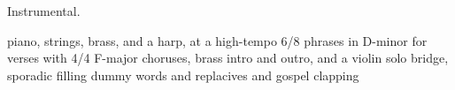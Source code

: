 
\begin{notes}
Instrumental.
\end{notes}
\begin{prompt}
piano, strings, brass, and a harp, at a high-tempo 6/8 phrases in D-minor for verses with 4/4 F-major choruses, brass intro and outro, and a violin solo bridge, sporadic filling dummy words and replacives and gospel clapping
\end{prompt}
